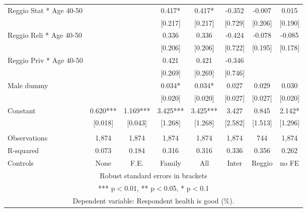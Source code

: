 \begin{tabular}{lccccccc}
Reggio Stat * Age 40-50 &  &  & 0.417* & 0.417* & -0.352 & -0.007 & 0.015 \\
 &  &  & [0.217] & [0.217] & [0.729] & [0.206] & [0.190] \\
Reggio Reli * Age 40-50 &  &  & 0.336 & 0.336 & -0.424 & -0.078 & -0.085 \\
 &  &  & [0.206] & [0.206] & [0.722] & [0.195] & [0.178] \\
Reggio Priv * Age 40-50 &  &  & 0.421 & 0.421 & -0.346 &  &  \\
 &  &  & [0.269] & [0.269] & [0.746] &  &  \\
Male dummy &  &  & 0.034* & 0.034* & 0.027 & 0.029 & 0.030 \\
 &  &  & [0.020] & [0.020] & [0.027] & [0.027] & [0.020] \\
Constant & 0.620*** & 1.169*** & 3.425*** & 3.425*** & 3.427 & 0.845 & 2.142* \\
 & [0.018] & [0.043] & [1.268] & [1.268] & [2.582] & [1.513] & [1.296] \\
 &  &  &  &  &  &  &  \\
Observations & 1,874 & 1,874 & 1,874 & 1,874 & 1,874 & 744 & 1,874 \\
R-squared & 0.073 & 0.184 & 0.316 & 0.316 & 0.336 & 0.356 & 0.262 \\
 Controls & None & F.E. & Family & All & Inter & Reggio & no FE \\ \hline
\multicolumn{8}{c}{ Robust standard errors in brackets} \\
\multicolumn{8}{c}{ *** p$<$0.01, ** p$<$0.05, * p$<$0.1} \\
\multicolumn{8}{c}{ Dependent variable: Respondent health is good (\%).} \\
\end{tabular}
